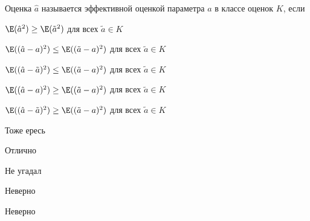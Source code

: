 
\begin{question}
Оценка \(\hat a\) называется эффективной оценкой параметра \(a\) в
классе оценок \(K\), если
\begin{answerlist}
  \item \(\E(\hat a^2) \geq \E(\tilde a ^2)\) для всех \(\tilde a \in K\)
  \item \(\E((\hat a - a)^2) \leq \E((\tilde a - a)^2)\) для всех
\(\tilde a \in K\)
  \item \(\E((\hat a - \tilde a)^2) \leq \E((\tilde a - a)^2)\) для всех
\(\tilde a \in K\)
  \item \(\E((\hat a - a)^2) \geq \E((\tilde a - a)^2)\) для всех
\(\tilde a \in K\)
  \item \(\E((\hat a - \tilde a)^2) \geq \E((\tilde a - a)^2)\) для всех
\(\tilde a \in K\)
\end{answerlist}
\end{question}

\begin{solution}
\begin{answerlist}
  \item Тоже ересь
  \item Отлично
  \item Не угадал
  \item Неверно
  \item Неверно
\end{answerlist}
\end{solution}

